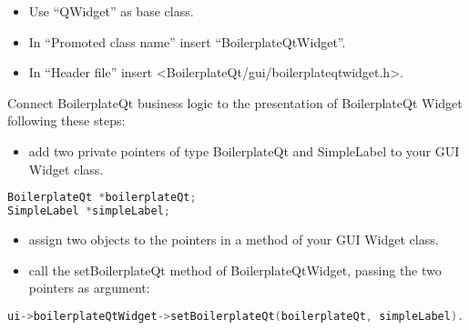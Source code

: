 \begin{itemize}
  \item
        Use ``QWidget'' as base class.
\end{itemize}

\begin{itemize}
  \item
        In ``Promoted class name'' insert ``BoilerplateQtWidget''.
\end{itemize}

\begin{itemize}
  \item
        In ``Header file'' insert
        \textless BoilerplateQt/gui/boilerplateqtwidget.h\textgreater.
\end{itemize}

Connect BoilerplateQt business logic to the presentation of
BoilerplateQt Widget following these steps:

\begin{itemize}
  \item
        add two private pointers of type BoilerplateQt and SimpleLabel to your
        GUI Widget class.
\end{itemize}

\begin{lstlisting}[language=c++]
BoilerplateQt *boilerplateQt;
SimpleLabel *simpleLabel;
\end{lstlisting}

\begin{itemize}
  \item
        assign two objects to the pointers in a method of your GUI Widget
        class.
\end{itemize}

\begin{itemize}
  \item
        call the setBoilerplateQt method of BoilerplateQtWidget, passing the
        two pointers as argument:
\end{itemize}

\begin{lstlisting}[language=c++]
  ui->boilerplateQtWidget->setBoilerplateQt(boilerplateQt, simpleLabel).
\end{lstlisting}
